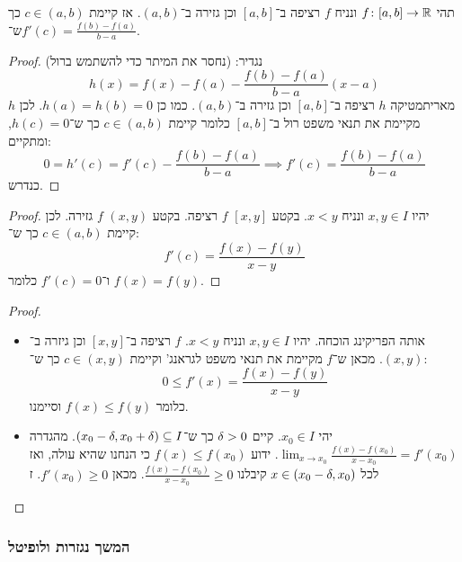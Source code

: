 \documentclass[name=רשימות חשבון דיפרנציאלי ואינטגרלי 1א]{../../../tex/classes/megasumPreamble}
\begin{document}
	\begin{Theorem}
		תהי $f \colon [a, b] \to \mathbb{R}$ ונניח $f$ רציפה ב־$[a, b]$ וכן גזירה ב־$(a, b)$. אז קיימת $c \in (a, b)$ כך ש־$f'(c) = \frac{f(b) - f(a)}{b - a}$.
	\end{Theorem}
	\begin{proof}
		נגדיר: (נחסר את המיתר כדי להשתמש ברול)
		\[ h(x) = f(x) - f(a) - \frac{f(b) - f(a)}{b - a}(x - a) \]
		מאריתמטיקה $h$ רציפה  ב־$[a, b]$ וכן גזירה ב־$(a, b)$. כמו כן $h(a) = h(b) = 0$. לכן $h$ מקיימת את תנאי משפט רול ב־$[a, b]$ כלומר קיימת $c \in (a, b)$ כך ש־$h(c) = 0$, ומתקיים:
		\[ 0 = h'(c) = f'(c) - \frac{f(b) - f(a)}{b - a} \implies f'(c) = \frac{f(b) - f(a)}{b - a} \]
		כנדרש.
	\end{proof}


	\begin{proof}
		יהיו $x, y \in I$ ונניח $x < y$. בקטע $[x, y]$ $f$ רציפה. בקטע $(x, y)$ $f$ גזירה. לכן קיימת $c \in (a, b)$ כך ש־:
		\[ f'(c) = \frac{f(x) - f(y)}{x - y} \]
		ו־$f'(c) = 0$ כלומר $f(x) = f(y)$.
	\end{proof}

	\begin{proof}
		\begin{itemize}
			\item[$\impliedby$]אותה הפריקינג הוכחה. יהיו $x, y \in I$ ונניח $x < y$. $f$ רציפה ב־$[x, y]$ וכן גיזרה ב־$(x, y)$. מכאן ש־$f$ מקיימת את תנאי משפט לגראנג' וקיימת $c \in (x, y)$ כך ש־:
			\[ 0 \le f'(x) = \frac{f(x) - f(y)}{x - y} \]
			כלומר $f(x) \le f(y)$ וסיימנו.
			\item[$\implies$]יהי $x_0 \in I$. קיים $\delta > 0$ כך ש־$(x_0 - \delta, x_0 + \delta) \subseteq I$. מהגדרה $\lim_{x \to x_0} \frac{f(x) - f(x_0)}{x - x_0} = f'(x_0)$. ידוע $f(x) \le f(x_0)$ כי הנחנו שהיא עולה, ואז לכל $x \in (x_0 - \delta, x_0)$ קיבלנו $\frac{f(x) - f(x_0)}{x - x_0} \ge 0$. מכאן $f'(x_0) \ge 0$. ז
		\end{itemize}
	\end{proof}


	\subsubsection{המשך נגזרות ולופיטל}
\end{document}
